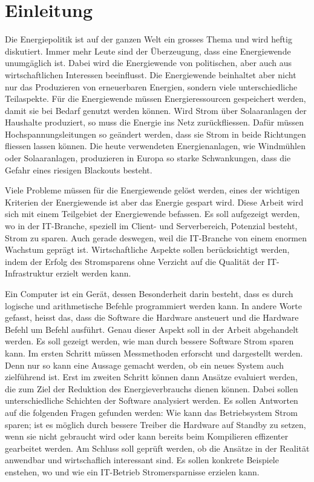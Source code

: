 \chapter{Einleitung}

Die Energiepolitik ist auf der ganzen Welt ein grosses Thema und wird heftig diskutiert. Immer mehr Leute
sind der Überzeugung, dass eine Energiewende unumgäglich ist. Dabei wird die Energiewende von politischen, aber auch
aus wirtschaftlichen Interessen beeinflusst. Die Energiewende beinhaltet aber nicht nur
das Produzieren von erneuerbaren Energien, sondern viele unterschiedliche Teilaspekte. Für die Energiewende
müssen Energieressourcen gespeichert werden, damit sie bei Bedarf genutzt werden können. Wird Strom über
Solaaranlagen der Haushalte produziert, so muss die Energie ins Netz zurückfliessen. Dafür müssen
Hochspannungsleitungen so geändert werden, dass sie Strom in beide Richtungen fliessen lassen können.
Die heute verwendeten Energienanlagen, wie Windmühlen oder Solaaranlagen, produzieren in Europa so starke
Schwankungen, dass die Gefahr eines riesigen Blackouts besteht.
\par
Viele Probleme müssen für die Energiewende gelöst werden, eines der wichtigen Kriterien der Energiewende ist aber
das Energie gespart wird. Diese Arbeit wird sich mit einem Teilgebiet der Energiewende befassen.
Es soll aufgezeigt werden, wo in der IT-Branche, speziell im Client- und Serverbereich, Potenzial besteht,
Strom zu sparen. Auch gerade deswegen, weil die IT-Branche von einem enormen Wachstum geprägt ist. Wirtschaftliche Aspekte sollen
berücksichtigt werden, indem der Erfolg des Stromsparens ohne Verzicht auf die Qualität der IT-Infrastruktur erzielt
werden kann. 
\par
Ein Computer ist ein Gerät, dessen Besonderheit darin besteht, dass es durch logische und arithmetische Befehle programmiert
werden kann. In andere Worte gefasst, heisst das, dass die Software die Hardware ansteuert und die Hardware Befehl um Befehl ausführt.
Genau dieser Aspekt soll in der Arbeit abgehandelt werden. Es soll gezeigt werden, wie man durch bessere Software Strom
sparen kann. Im ersten Schritt müssen Messmethoden erforscht und dargestellt werden. Denn nur so kann eine Aussage
gemacht werden, ob ein neues System auch zielführend ist. Erst im zweiten Schritt können dann
Ansätze evaluiert werden, die zum Ziel der Reduktion des Energieverbrauchs dienen können. 
Dabei sollen unterschiedliche Schichten der Software analysiert werden. Es sollen Antworten auf die folgenden Fragen gefunden werden:
Wie kann das Betriebsystem Strom sparen; ist es möglich durch bessere Treiber die Hardware auf Standby zu setzen, wenn sie nicht gebraucht wird
oder kann bereits beim Kompilieren effizenter gearbeitet werden. Am Schluss soll geprüft werden,
ob die Ansätze in der Realität anwendbar und wirtschaflich interessant sind. Es sollen konkrete Beispiele enstehen, wo und wie ein
IT-Betrieb Stromersparnisse erzielen kann.

